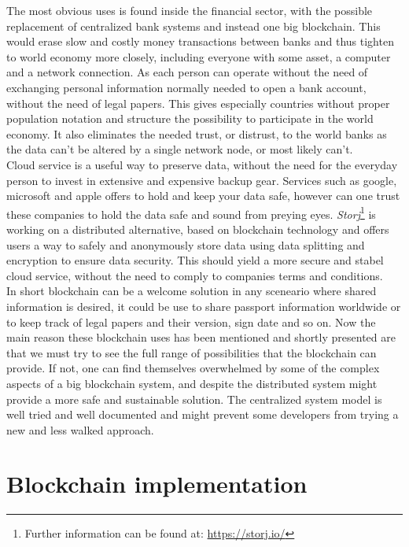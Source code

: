 \documentclass[paper=a4, fontsize=11pt]{scrartcl} %
\numberwithin{equation}{section} %
\numberwithin{figure}{section} %
\numberwithin{table}{section} %
\begin{document}
The most obvious uses is found inside the financial sector, with the possible replacement of centralized bank systems and instead one big blockchain. This would erase slow and costly money transactions between banks and thus tighten to world economy more closely, including everyone with some asset, a computer and a network connection. As each person can operate without the need of exchanging personal information normally needed to open a bank account, without the need of legal papers. This gives especially countries without proper population notation and structure the possibility to participate in the world economy. It also eliminates the needed trust, or distrust, to the world banks as the data can't be altered by a single network node, or most likely can't\cite{51}.\\

Cloud service is a useful way to preserve data, without the need for the everyday person to invest in extensive and expensive backup gear. Services such as google, microsoft and apple offers to hold and keep your data safe, however can one trust these companies to hold the data safe and sound from preying eyes. \textit{Storj}\footnote{Further information can be found at: \url{https://storj.io/}} is working on a distributed alternative, based on blockchain technology and offers users a way to safely and anonymously store data using data splitting and encryption to ensure data security. This should yield a more secure and stabel cloud service, without the need to comply to companies terms and conditions\cite{uses}.\\

In short blockchain can be a welcome solution in any sceneario where shared information is desired, it could be use to share passport information worldwide or to keep track of legal papers and their version, sign date and so on. Now the main reason these blockchain uses has been mentioned and shortly presented are that we must try to see the full range of possibilities that the blockchain can provide. If not, one can find themselves overwhelmed by some of the complex aspects of a big blockchain system, and despite the distributed system might provide a more safe and sustainable solution. The centralized system model is well tried and well documented and might prevent some developers from trying a new and less walked approach.


\section{Blockchain implementation}
\end{document}
